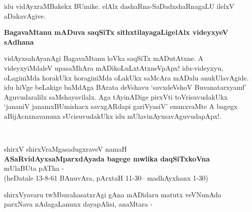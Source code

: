 idu vidAyxraMBakekx BUmike. elAlx dashaRna-SaDadxshaRnagaLU ilelxV aDakavAgive.

{\bigskip
\noindent
{\large\bf BagavaMtanu mADuva saqSiTx sithxtilayagaLigelAlx videyxyeV sAdhana}}\label{page101a}
\medskip

\noindent
vidAyxsahAyanAgi BagavaMtanu loVka saqSiTx mADutAtxne. A videyxyiMdaleV upasaMhAra mADikoLuLxtAtxneVpApx! idu-videyxyu, oLaginiMda horakUkx horaginiMda oLakUkx saMcAra mADalu anukUlavAgide. idu hiVge beLakige baMdAga BArata deVshavu `savxdeVshoV Buvanatarxyamf' Aguvudaralilx saMshayavilalx. Aga tAyinADige pirxVti toVrisuvudakUkx `jananiV janamxBUmishacx savxgARdapi gariVyasiV'\label{101} enunxvaMte A bagegx aBijAcnxnavanunx sUcisuvudakUkx idu mUlavinAyxsavAguvudapApx!.

\newpage

~\phantom{a}

\bigskip

\begin{center}
shirxV shirxVraMgasadugxraveV namaH\\[.15cm]
{\Large\textbf{ASaRvidAyxsaMparxdAyada bagege mwlika daqSiTxkoVna}}\\[.15cm]
mUlaBUta pATha -\\[.15cm]
(heDatale 13-8-61 BAnuvAra, pArxtaH 11-30-- madhAyxhanx 1-30)
\end{center}

\medskip
\noindent
shirxVyavaru twMburahasatxrAgi gAna mADidaru matutx veVNunAda parxNava nAdagaLanunx dayapAlisi, anaMtara -


